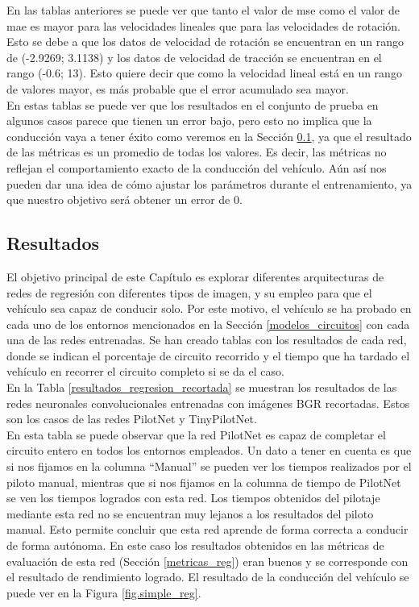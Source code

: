 En las tablas anteriores se puede ver que tanto el valor de \acrshort{mse} como el valor de \acrshort{mae} es mayor para las velocidades lineales que para las velocidades de rotación. Esto se debe a que los datos de velocidad de rotación se encuentran en un rango de (-2.9269; 3.1138) y los datos de velocidad de tracción se encuentran en el rango (-0.6; 13). Esto quiere decir que como la velocidad lineal está en un rango de valores mayor, es más probable que el error acumulado sea mayor.\\

En estas tablas se puede ver que los resultados en el conjunto de prueba en algunos casos parece que tienen un error bajo, pero esto no implica que la conducción vaya a tener éxito como veremos en la Sección \ref{resultados_regresion}, ya que el resultado de las métricas es un promedio de todas los valores. Es decir, las métricas no reflejan el comportamiento exacto de la conducción del vehículo. Aún así nos pueden dar una idea de cómo ajustar los parámetros durante el entrenamiento, ya que nuestro objetivo será obtener un error de 0.\\



\subsection{Resultados}\label{resultados_regresion}

El objetivo principal de este Capítulo es explorar diferentes arquitecturas de redes de regresión con diferentes tipos de imagen, y su empleo para que el vehículo sea capaz de conducir solo. Por este motivo, el vehículo se ha probado en cada uno de los entornos mencionados en la Sección \ref{modelos_circuitos} con cada una de las redes entrenadas. Se han creado tablas con los resultados de cada red, donde se indican el porcentaje de circuito recorrido y el tiempo que ha tardado el vehículo en recorrer el circuito completo si se da el caso.\\

En la Tabla \ref{resultados_regresion_recortada} se muestran los resultados de las redes neuronales convolucionales entrenadas con imágenes BGR recortadas. Estos son los casos de las redes PilotNet y TinyPilotNet.\\

En esta tabla se puede observar que la red PilotNet es capaz de completar el circuito entero en todos los entornos empleados. Un dato a tener en cuenta es que si nos fijamos en la columna ``Manual'' se pueden ver los tiempos realizados por el piloto manual, mientras que si nos fijamos en la columna de tiempo de PilotNet se ven los tiempos logrados con esta red. Los tiempos obtenidos del pilotaje mediante esta red no se encuentran muy lejanos a los resultados del piloto manual. Esto permite concluir que esta red aprende de forma correcta a conducir de forma autónoma. En este caso los resultados obtenidos en las métricas de evaluación de esta red (Sección \ref{metricas_reg}) eran buenos y se corresponde con el resultado de rendimiento logrado. El resultado de la conducción del vehículo se puede ver en la Figura \ref{fig.simple_reg}.\\

